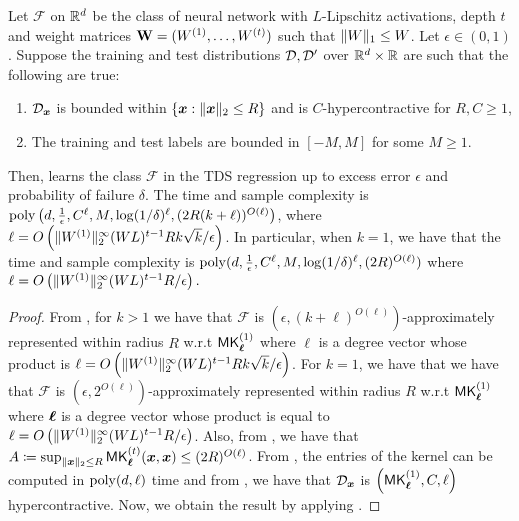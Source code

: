 \begin{theorem}
\label{thm:tds_learning_lipschitz_appendix}
Let $\mathcal{F}$ on $\mathbb{R}^{d}$ be the class of  neural network with $L$-Lipschitz  activations, depth $t$ and weight matrices $\mathbf{W}=(W^{(1)},\ldots,W^{(t)})$ such that $\|W\|_1\leq W$.  Let $\epsilon\in (0,1)$. Suppose the training and test distributions ${\mathcal{D}},{\mathcal{D}}'$ over $\mathbb{R}^{d}\times \mathbb{R}$ are such that the following are true:
\begin{enumerate}
    \item ${\mathcal{D}}_{{\bm{x}}}$ is bounded within $\{{\bm{x}}:\|{\bm{x}}\|_{2}\leq R\}$ and is $C$-hypercontractive for $R,C\geq 1$,
    \item The training and test labels are bounded in $[-M,M]$ for some $M\geq 1$.
\end{enumerate}
Then,  learns the class $\mathcal{F}$ in the TDS regression up to excess error $\epsilon$ and probability of failure $\delta$. The time and sample complexity is $\mathrm{poly}\left(d,\frac{1}{\epsilon},C^{\ell}, M,\log(1/\delta)^{\ell},(2R(k+\ell))^{O(\ell)}\right)$, where $\ell=O\left(\|W^{(1)}\|_{2}^{\infty}(WL)^{t-1}Rk\sqrt{k}/\epsilon\right)$. In particular, when $k=1$, we have that the time and sample complexity is $\mathrm{poly}(d,\frac{1}{\epsilon},C^{\ell},M,\log(1/\delta)^{\ell},(2R)^{O(\ell)})$ where $\ell=O\left(\|W^{(1)}\|_{2}^{\infty}(WL)^{t-1}R/\epsilon\right).$
\end{theorem}
\begin{proof}
    From , for $k>1$ we have that $\mathcal{F}$ is $(\epsilon, (k+\ell)^{O(\ell)})$-approximately represented within radius $R$ w.r.t $\mathsf{MK}_{\boldsymbol{\ell}}^{(1)}$ where $\ell$ is a degree vector whose product is $\ell=O\left(\|W^{(1)}\|_{2}^{\infty}(WL)^{t-1}Rk\sqrt{k}/\epsilon\right)$. For $k=1$, we have that we have that $\mathcal{F}$ is $(\epsilon, 2^{O(\ell)})$-approximately represented within radius $R$ w.r.t $\mathsf{MK}_{\boldsymbol{\ell}}^{(1)}$ where $\boldsymbol{\ell}$ is a degree vector whose product is equal to $\ell=O\left(\|W^{(1)}\|_{2}^{\infty}(WL)^{t-1}R/\epsilon\right)$. Also, from , we have that $A\coloneq \sup_{\|{\bm{x}}\|_{2}\leq R}\mathsf{MK}_{\boldsymbol{\ell}}^{(t)}({\bm{x}},{\bm{x}})\leq (2R)^{O(\ell)}$. From , the entries of the kernel can be computed in $\mathrm{poly}(d,\ell)$ time and from , we have that ${\mathcal{D}}_{{\bm{x}}}$ is $\left(\mathsf{MK}_{\boldsymbol{\ell}}^{(1)},C,\ell\right)$ hypercontractive. Now, we obtain the result by applying .
\end{proof}

